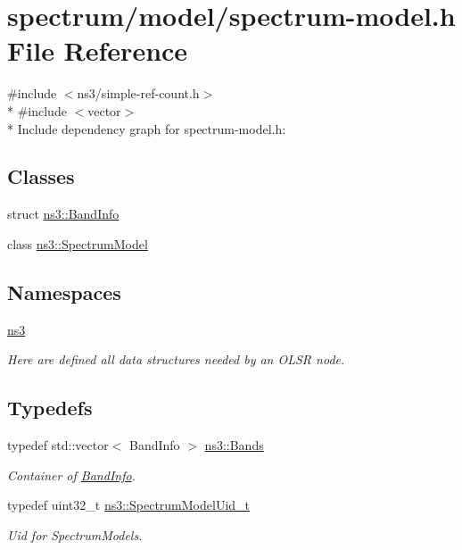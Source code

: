 \hypertarget{spectrum-model_8h}{}\section{spectrum/model/spectrum-\/model.h File Reference}
\label{spectrum-model_8h}
{\ttfamily \#include $<$ns3/simple-\/ref-\/count.\+h$>$}\\*
{\ttfamily \#include $<$vector$>$}\\*
Include dependency graph for spectrum-\/model.h\+:
\subsection*{Classes}
\begin{DoxyCompactItemize}
\item 
struct \hyperlink{structns3_1_1BandInfo}{ns3\+::\+Band\+Info}
\item 
class \hyperlink{classns3_1_1SpectrumModel}{ns3\+::\+Spectrum\+Model}
\end{DoxyCompactItemize}
\subsection*{Namespaces}
\begin{DoxyCompactItemize}
\item 
 \hyperlink{namespacens3}{ns3}
\begin{DoxyCompactList}\small\item\em Here are defined all data structures needed by an O\+L\+SR node. \end{DoxyCompactList}\end{DoxyCompactItemize}
\subsection*{Typedefs}
\begin{DoxyCompactItemize}
\item 
typedef std\+::vector$<$ Band\+Info $>$ \hyperlink{namespacens3_a46ac9188e5cf43bd5292f7b67451246e}{ns3\+::\+Bands}
\begin{DoxyCompactList}\small\item\em Container of \hyperlink{structns3_1_1BandInfo}{Band\+Info}. \end{DoxyCompactList}\item 
typedef uint32\+\_\+t \hyperlink{namespacens3_a5bf0e89b3407bbb59c90a4d8c4cf0a18}{ns3\+::\+Spectrum\+Model\+Uid\+\_\+t}
\begin{DoxyCompactList}\small\item\em Uid for Spectrum\+Models. \end{DoxyCompactList}\end{DoxyCompactItemize}
